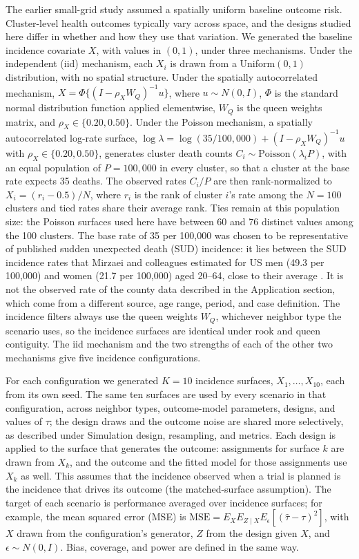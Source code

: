 \documentclass[11pt]{article}
\begin{document}
The earlier small-grid study \citep{walther_spatialcrt_2026} assumed a
spatially uniform baseline outcome risk. Cluster-level health outcomes
typically vary across space, and the designs studied here differ in
whether and how they use that variation. We generated the baseline
incidence covariate \(X\), with values in \((0, 1)\), under three
mechanisms. Under the independent (iid) mechanism, each \(X_i\) is drawn
from a Uniform\((0,1)\) distribution, with no spatial structure. Under
the spatially autocorrelated mechanism,
\(X = \Phi\{(I - \rho_X W_Q)^{-1} u\}\), where \(u \sim N(0, I)\),
\(\Phi\) is the standard normal distribution function applied
elementwise, \(W_Q\) is the queen weights matrix, and
\(\rho_X \in \{0.20, 0.50\}\). Under the Poisson mechanism, a spatially
autocorrelated log-rate surface,
\(\log \lambda = \log(35/100{,}000) + (I - \rho_X W_Q)^{-1} u\) with
\(\rho_X \in \{0.20, 0.50\}\), generates cluster death counts
\(C_i \sim \text{Poisson}(\lambda_i P)\), with an equal population of
\(P = 100{,}000\) in every cluster, so that a cluster at the base rate
expects 35 deaths. The observed rates \(C_i / P\) are then
rank-normalized to \(X_i = (r_i - 0.5)/N\), where \(r_i\) is the rank of
cluster \(i\)'s rate among the \(N = 100\) clusters and tied rates share
their average rank. Ties remain at this population size: the Poisson
surfaces used here have between 60 and 76 distinct values among the 100
clusters. The base rate of 35 per 100,000 was chosen to be
representative of published sudden unexpected death (SUD) incidence: it lies between the SUD
incidence rates that Mirzaei and colleagues estimated for US men (49.3
per 100,000) and women (21.7 per 100,000) aged 20--64, close to their
average \citep{mirzaei_years_2019}. It is not the observed rate of the
county data described in the Application section, which come from a
different source, age range, period, and case definition. The incidence
filters always use the queen weights \(W_Q\), whichever neighbor type
the scenario uses, so the incidence surfaces are identical under rook
and queen contiguity. The iid mechanism and the two strengths of each of
the other two mechanisms give five incidence configurations.

For each configuration we generated \(K = 10\) incidence surfaces,
\(X_1, \dots, X_{10}\), each from its own seed. The same ten surfaces
are used by every scenario in that configuration, across neighbor types,
outcome-model parameters, designs, and values of \(\tau\); the design
draws and the outcome noise are shared more selectively, as described
under Simulation design, resampling, and metrics. Each design is applied
to the surface that generates the outcome: assignments for surface \(k\)
are drawn from \(X_k\), and the outcome and the fitted model for those
assignments use \(X_k\) as well. This assumes that the incidence
observed when a trial is planned is the incidence that drives its
outcome (the matched-surface assumption). The target of each scenario is
performance averaged over incidence surfaces; for example, the mean squared error (MSE) is \(\text{MSE} = E_X E_{Z \mid X} E_\epsilon[(\hat\tau - \tau)^2]\), with
\(X\) drawn from the configuration's generator, \(Z\) from the design
given \(X\), and \(\epsilon \sim N(0, I)\). Bias, coverage, and power
are defined in the same way.
\end{document}
